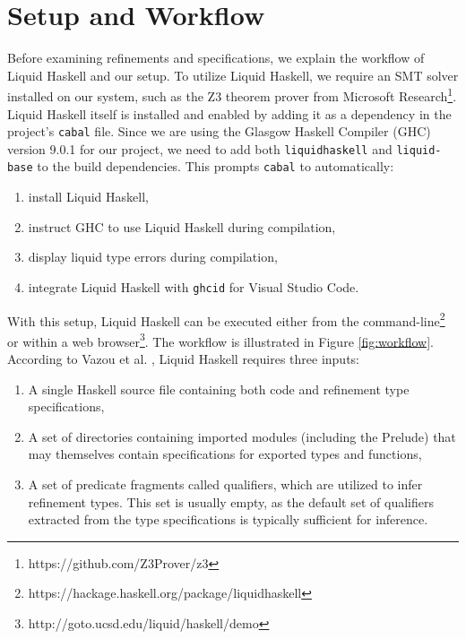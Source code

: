 \documentclass{clmthesis}
\begin{document}
\section{Setup and Workflow}\label{sec:setup}
Before examining refinements and specifications, we explain the workflow of Liquid Haskell and our setup.
To utilize Liquid Haskell, we require an SMT solver installed on our system, such as the Z3 theorem prover from Microsoft Research\footnote{https://github.com/Z3Prover/z3}. Liquid Haskell itself is installed and enabled by adding it as a dependency in the project's \lstinline|cabal| file. Since we are using the Glasgow Haskell Compiler (GHC) version 9.0.1 for our project, we need to add both \texttt{liquidhaskell} and \texttt{liquid-base} to the build dependencies. This prompts \lstinline|cabal| to automatically:
\begin{enumerate}
	\item install Liquid Haskell,
	\item instruct GHC to use Liquid Haskell during compilation,
	\item display liquid type errors during compilation,
	\item integrate Liquid Haskell with \lstinline|ghcid| for Visual Studio Code.
\end{enumerate}
With this setup, Liquid Haskell can be executed either from the command-line\footnote{https://hackage.haskell.org/package/liquidhaskell} or within a web browser\footnote{http://goto.ucsd.edu/liquid/haskell/demo}. The workflow is illustrated in Figure \ref{fig:workflow}. According to Vazou et al. \cite{vazou2014liquidhaskell}, Liquid Haskell requires three inputs:
\begin{enumerate}
	\item A single Haskell source file containing both code and refinement type specifications,%
	\item A set of directories containing imported modules (including the Prelude) that may themselves contain specifications for exported types and functions,
	\item A set of predicate fragments called qualifiers, which are utilized to infer refinement types. This set is usually empty, as the default set of qualifiers extracted from the type specifications is typically sufficient for inference.
\end{enumerate}  
\end{document}
